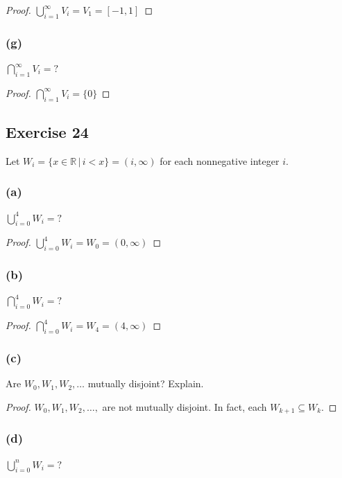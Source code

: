\documentclass[14pt]{extarticle}
\newcommand{\dps}{\displaystyle}
\newcommand{\R}{\mathbb{R}}
\begin{document}
\begin{proof}
\(\dps \bigcup_{i=1}^{\infty}V_i = V_1 = [-1, 1]\)
\end{proof}

\subsubsection{(g)}
\(\dps \bigcap_{i=1}^{\infty}V_i = ?\)

\begin{proof}
\(\dps \bigcap_{i=1}^{\infty}V_i = \{0\}\)
\end{proof}

\subsection{Exercise 24}
Let \(W_i = \{x \in \R \,|\, i < x\} = (i, \infty)\) for each nonnegative integer $i$.

\subsubsection{(a)}
\(\dps \bigcup_{i=0}^{4}W_i = ?\)

\begin{proof}
\(\dps \bigcup_{i=0}^{4}W_i = W_0 = (0, \infty)\)
\end{proof}

\subsubsection{(b)}
\(\dps \bigcap_{i=0}^{4}W_i = ?\)

\begin{proof}
\(\dps \bigcap_{i=0}^{4}W_i = W_4 = (4, \infty)\)
\end{proof}

\subsubsection{(c)}
Are \(W_0, W_1, W_2, \ldots\) mutually disjoint? Explain.

\begin{proof}
$W_0, W_1, W_2, \ldots,$ are not mutually disjoint. In fact, each \(W_{k+1} \subseteq W_k\).
\end{proof}

\subsubsection{(d)}
\(\dps \bigcup_{i=0}^{n}W_i = ?\)
\end{document}
